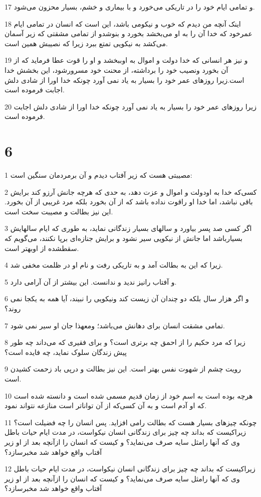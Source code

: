 \par 17 و تمامی ایام خود را در تاریکی می‌خورد و با بیماری و خشم، بسیار محزون می‌شود.
\par 18 اینک آنچه من دیدم که خوب و نیکومی باشد، این است که انسان در تمامی ایام عمرخود که خدا آن را به او می‌بخشد بخورد و بنوشدو از تمامی مشقتی که زیر آسمان می‌کشد به نیکویی تمتع ببرد زیرا که نصیبش همین است.
\par 19 و نیز هر انسانی که خدا دولت و اموال به اوببخشد و او را قوت عطا فرماید که از آن بخورد ونصیب خود را برداشته، از محنت خود مسرورشود، این بخشش خدا است.زیرا روزهای عمر خود را بسیار به یاد نمی آورد چونکه خدا اورا از شادی دلش اجابت فرموده است.
\par 20 زیرا روزهای عمر خود را بسیار به یاد نمی آورد چونکه خدا اورا از شادی دلش اجابت فرموده است.
 
\chapter{6}

\par 1 مصیبتی هست که زیر آفتاب دیدم و آن برمردمان سنگین است:
\par 2 کسی‌که خدا به اودولت و اموال و عزت دهد، به حدی که هر‌چه جانش آرزو کند برایش باقی نباشد، اما خدا او راقوت نداده باشد که از آن بخورد بلکه مرد غریبی از آن بخورد. این نیز بطالت و مصیبت سخت است.
\par 3 اگر کسی صد پسر بیاورد و سالهای بسیار زندگانی نماید، به طوری که ایام سالهایش بسیارباشد اما جانش از نیکویی سیر نشود و برایش جنازه‌ای برپا نکنند، می‌گویم که سقطشده از اوبهتر است.
\par 4 زیرا که این به بطالت آمد و به تاریکی رفت و نام او در ظلمت مخفی شد.
\par 5 و آفتاب رانیز ندید و ندانست. این بیشتر از آن آرامی دارد.
\par 6 و اگر هزار سال بلکه دو چندان آن زیست کند ونیکویی را نبیند، آیا همه به یکجا نمی روند؟
\par 7 تمامی مشقت انسان برای دهانش می‌باشد؛ ومعهذا جان او سیر نمی شود.
\par 8 زیرا که مرد حکیم را از احمق چه برتری است؟ و برای فقیری که می‌داند چه طور پیش زندگان سلوک نماید، چه فایده است؟
\par 9 رویت چشم از شهوت نفس بهتر است. این نیز بطالت و در‌پی باد زحمت کشیدن است.
\par 10 هرچه بوده است به اسم خود از زمان قدیم مسمی شده است و دانسته شده است که او آدم است و به آن کسی‌که از آن تواناتر است منازعه نتواند نمود.
\par 11 چونکه چیزهای بسیار هست که بطالت رامی افزاید. پس انسان را چه فضیلت است؟زیراکیست که بداند چه چیز برای زندگانی انسان نیکواست، در مدت ایام حیات باطل وی که آنها رامثل سایه صرف می‌نماید؟ و کیست که انسان را ازآنچه بعد از او زیر آفتاب واقع خواهد شد مخبرسازد؟
\par 12 زیراکیست که بداند چه چیز برای زندگانی انسان نیکواست، در مدت ایام حیات باطل وی که آنها رامثل سایه صرف می‌نماید؟ و کیست که انسان را ازآنچه بعد از او زیر آفتاب واقع خواهد شد مخبرسازد؟
 
